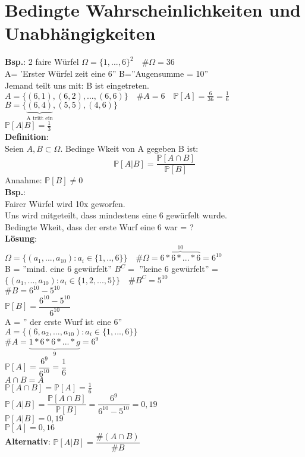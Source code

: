 \chapter{Bedingte Wahrscheinlichkeiten und Unabhängigkeiten}
\textbf{Bsp.}: 2 faire Würfel \hspace{1cm} $\Omega = \{1,...,6\}^2 \quad \#\Omega=36$\\
A= 'Erster Würfel zeit eine 6''\hspace{1cm} B=''Augensumme = 10''\smallskip\\
Jemand teilt uns mit: B ist eingetreten.\smallskip\\
$A=\{(6,1),(6,2),...,(6,6)\} \quad \#A =6 \quad \mathds{P}[A] = \frac{6}{36}= \frac{1}{6}$
$B=\{\underbrace{(6,4)}_\text{A tritt ein},(5,5),(4,6)\}$\medskip\\
$\mathds{P}[A|B]= \frac{1}{3}$\medskip\\
\textbf{Definition}:\\
Seien $A,B \subset \Omega$. Bedinge Wkeit von A gegeben B ist: $$\mathds{P}[A|B] = \dfrac{\mathds{P}[A \cap B]}{\mathds{P}[B]}$$
Annahme: $\mathds{P}[B] \neq 0$\medskip\\
\textbf{Bsp.}:\\ Fairer Würfel wird 10x geworfen.\\
Uns wird mitgeteilt, dass mindestens eine 6 gewürfelt wurde.\smallskip\\
Bedingte Wkeit, dass der erste Wurf eine 6 war = ?\medskip\\
\textbf{Lösung}:\\
$\Omega = \{(a_1,...,a_{10}):a_i \in \{1,..,6\}\} \quad \#\Omega = \overbrace{6*6*...*6}^{10} = 6^{10}$\\
B = ''mind. eine 6 gewürfelt'' \hspace{1cm} $B^C =$ ''keine 6 gewürfelt'' =\\
$\{(a_1,...,a_10):a_i \in \{1,2,...,5\}\} \quad \#B^C = 5^{10}$\smallskip\\
$\#B = 6^{10}-5^{10}$\\
$\mathds{P}[B] = \dfrac{6^{10}-5^{10}}{6^{10}}$\smallskip\\
A = '' der erste Wurf ist eine 6''\\
$A = \{(6,a_2,...,a_10):a_i \in \{1,...,6\}\}$\\
$\#A = \underbrace{1*6*6*...*g}_9 = 6^9	$\smallskip\\
$\mathds{P}[A] = \dfrac{6^9}{6^{10}}= \dfrac{1}{6}$\medskip\\
$A\cap B = A$\\
$\mathds{P}[A\cap B] = \mathds{P}[A]=\frac{1}{6}$\smallskip\\
$\mathds{P}[A  \vert B ] = \dfrac{\mathds{P}[A \cap B]}{\mathds{P}[B]} = \dfrac{6^9}{6^{10}-5^{10}} = 0,19$\medskip\\
$\mathds{P}[A\vert B] = 0,19$\\
$\mathds{P}[A] = 0,16$\medskip\\
\textbf{Alternativ}: $\mathds{P}[A\vert B] = \dfrac{\#(A\cap B)}{\#B}$\medskip\\
